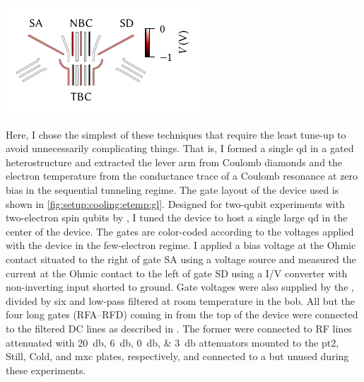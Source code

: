 \begin{marginfigure}
    \centering
    \includegraphics{img/pdf/setup/diamonds_gl}
    \caption[]{
        Gate layout of a quadruple \acrlong{qd} with two charge sensor \glspl{qd} from .
        Ohmic contacts used for transport measurements are right (left) of SA (SD).
        The gates are colored according to the voltages applied with the device hosting a single large \gls{qd} in the few-electron, sequential tunneling regime.
    }
    \label{fig:setup:cooling:etemp:gl}
\end{marginfigure}

Here, I chose the simplest of these techniques that require the least tune-up to avoid unnecessarily complicating things.
That is, I formed a single \gls{qd} in a gated \GaAsAlGaAs heterostructure and extracted the lever arm from Coulomb diamonds and the electron temperature from the conductance trace of a Coulomb resonance at zero bias in the sequential tunneling regime.
The gate layout of the device used is shown in \cref{fig:setup:cooling:etemp:gl}.
Designed for two-qubit experiments with two-electron spin qubits by \citet{Cerfontaine2019}, I tuned the device to host a single large \gls{qd} in the center of the device.
The gates are color-coded according to the voltages applied with the device in the few-electron regime.
I applied a bias voltage at the Ohmic contact situated to the right of gate SA using a \decadac voltage source and measured the current at the Ohmic contact to the left of gate SD using a \baseltia I/V converter with non-inverting input shorted to ground.
Gate voltages were also supplied by the \decadac, divided by six and low-pass filtered at room temperature in the \gls{bob}.
All but the four long gates (RFA--RFD) coming in from the top of the device were connected to the filtered DC lines as described in .
The former were connected to RF lines attenuated with \qtylist{20;6;0;3}{\decibel} attenuators mounted to the \gls{pt2}, Still, Cold, and \gls{mxc} plates, respectively, and connected to a \hdawg but unused during these experiments.

